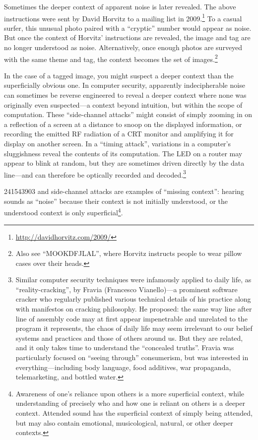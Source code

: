 \documentclass{thesis}
\begin{document}
Sometimes the deeper context of apparent noise is later revealed. The above instructions were sent by David Horvitz to a mailing list in 2009.\footnote{\url{http://davidhorvitz.com/2009/}} To a casual surfer, this unusual photo paired with a ``cryptic'' number would appear as noise. But once the context of Horvitz' instructions are revealed, the image and tag are no longer understood as noise. Alternatively, once enough photos are surveyed with the same theme and tag, the context becomes the set of images.\footnote{Also see ``MOOKDFJLAL''\cite{david_horvitz_flickr:_????}, where Horvitz instructs people to wear pillow cases over their heads.}

In the case of a tagged image, you might suspect a deeper context than the superficially obvious one. In computer security, apparently indecipherable noise can sometimes be reverse engineered to reveal a deeper context where none was originally even suspected---a context beyond intuition, but within the scope of computation. These ``side-channel attacks'' might consist of simply zooming in on a reflection of a screen at a distance to snoop on the displayed information,\cite{w._wayt_gibbs_hackers_2009} or recording the emitted RF radiation of a CRT monitor and amplifying it for display on another screen.\cite{erik_thiele_tempest_????} In a ``timing attack'', variations in a computer's sluggishness reveal the contents of its computation. The LED on a router may appear to blink at random, but they are sometimes driven directly by the data line---and can therefore be optically recorded and decoded.\footnote{Similar computer security techniques were infamously applied to daily life, as ``reality-cracking''\cite{francesco_vianello_reality_????}, by Fravia (Francesco Vianello)---a prominent software cracker who regularly published various technical details of his practice along with manifestos on cracking philosophy. He proposed: the same way line after line of assembly code may at first appear impenetrable and unrelated to the program it represents, the chaos of daily life may seem irrelevant to our belief systems and practices and those of others around us. But they are related, and it only takes time to understand the ``concealed truths''. Fravia was particularly focused on ``seeing through'' consumerism, but was interested in everything---including body language, food additives, war propaganda, telemarketing, and bottled water.}

241543903 and side-channel attacks are examples of ``missing context'': hearing sounds as ``noise'' because their context is not initially understood, or the understood context is only superficial\footnote{Awareness of one's reliance upon others is a more superficial context, while understanding of precisely who and how one is reliant on others is a deeper context. Attended sound has the superficial context of simply being attended, but may also contain emotional, musicological, natural, or other deeper contexts.}.
\end{document}
